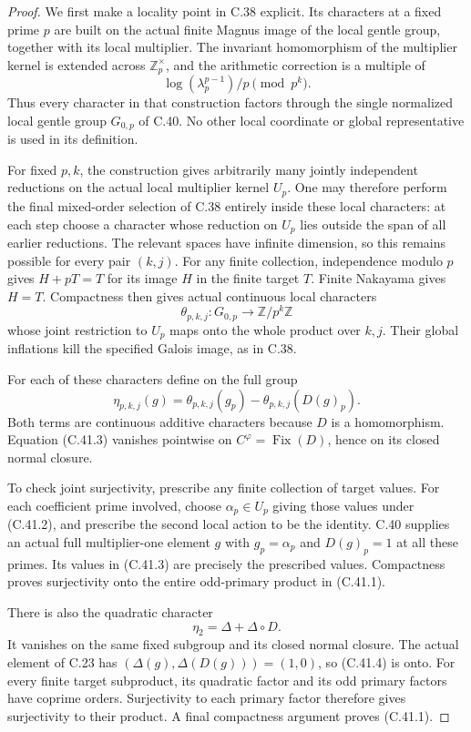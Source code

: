 \begin{proof}
We first make a locality point in C.38 explicit. Its
characters at a fixed prime $p$ are built on the actual
finite Magnus image of the local gentle group, together
with its local multiplier. The invariant homomorphism
of the multiplier kernel is extended across
$\mathbb Z_p^\times$, and the arithmetic correction
is a multiple of
\[
                  \log(\lambda_p^{p-1})/p\pmod{p^k}.
\]
Thus every character in that construction factors
through the single normalized local gentle group
$G_{0,p}$ of C.40. No other local coordinate or
global representative is used in its definition.

For fixed $p,k$, the construction gives arbitrarily
many jointly independent reductions on the actual
local multiplier kernel $U_p$. One may therefore
perform the final mixed-order selection of C.38
entirely inside these local characters: at each
step choose a character whose reduction on $U_p$
lies outside the span of all earlier reductions.
The relevant spaces have infinite dimension, so
this remains possible for every pair $(k,j)$.
For any finite collection, independence modulo $p$
gives $H+pT=T$ for its image $H$ in the finite
target $T$. Finite Nakayama gives $H=T$.
Compactness then gives actual continuous local
characters
\[
 \theta_{p,k,j}:G_{0,p}\longrightarrow\mathbb Z/p^k\mathbb Z
                                                        \tag{C.41.2}
\]
whose joint restriction to $U_p$ maps onto the
whole product over $k,j$. Their global inflations
kill the specified Galois image, as in C.38.

For each of these characters define on the full group
\[
 \eta_{p,k,j}(g)=
       \theta_{p,k,j}(g_p)-\theta_{p,k,j}(D(g)_p).
                                                        \tag{C.41.3}
\]
Both terms are continuous additive characters because
$D$ is a homomorphism. Equation (C.41.3) vanishes
pointwise on $C^\varphi=\operatorname{Fix}(D)$, hence
on its closed normal closure.

To check joint surjectivity, prescribe any finite
collection of target values. For each coefficient
prime involved, choose $\alpha_p\in U_p$ giving
those values under (C.41.2), and prescribe the
second local action to be the identity. C.40
supplies an actual full multiplier-one element
$g$ with $g_p=\alpha_p$ and $D(g)_p=1$ at all
these primes. Its values in (C.41.3) are precisely
the prescribed values. Compactness proves
surjectivity onto the entire odd-primary product
in (C.41.1).

There is also the quadratic character
\[
                       \eta_2=\Delta+\Delta\circ D.
                                                        \tag{C.41.4}
\]
It vanishes on the same fixed subgroup and its
closed normal closure. The actual element of
C.23 has $(\Delta(g),\Delta(D(g)))=(1,0)$,
so (C.41.4) is onto. For every finite target
subproduct, its quadratic factor and its odd
primary factors have coprime orders. Surjectivity
to each primary factor therefore gives
surjectivity to their product. A final compactness
argument proves (C.41.1).


\end{proof}
